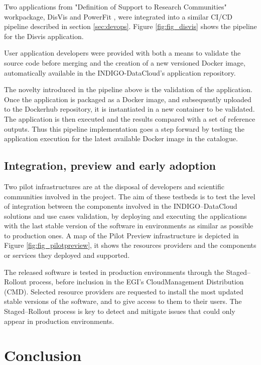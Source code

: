 \documentclass[journal]{IEEEtran}
\begin{document}
Two applications from "Definition of Support to Research Communities" workpackage, 
DisVis \cite{disvis} and PowerFit \cite{powerfit}, were
integrated into a similar CI/CD pipeline described in section \ref{sec:devops}.
Figure \ref{fig:fig_disvis} shows the pipeline for the Disvis application.

User application developers were provided with both a means to validate the
source code before merging and the creation of a new versioned Docker image,
automatically available in the INDIGO-DataCloud’s application repository.

The novelty introduced in the pipeline above is the validation of the application.
Once the application is packaged as a Docker image, and subsequently uploaded
to the Dockerhub repository, it is instantiated in a new container to be validated.
The application is then executed and the results compared with a set of reference outputs.
Thus this pipeline implementation goes a step forward by testing the application
execution for the latest available Docker image in the catalogue.

\subsection{Integration, preview and early adoption}

Two pilot infrastructures are at the disposal of developers and scientific
communities involved in the project. The aim of these testbeds is to test the
level of integration between the components involved in the INDIGO--DataCloud
solutions and use cases validation, by deploying and executing the applications
with the last stable version of the software in environments as similar as 
possible to production ones. A map of the Pilot Preview
infrastructure is depicted in Figure \ref{fig:fig_pilotpreview}, it shows the
resources providers and the components or services they deployed and supported.


The released software is tested in production environments through the
Staged--Rollout process, before inclusion in the EGI's CloudManagement Distribution (CMD). 
Selected resource providers are requested to install
the most updated stable versions of the software, and to give access to them to their users. The
Staged--Rollout process is key to detect and mitigate issues that could only
appear in production environments.

\section{Conclusion}
\label{sec:con}
\end{document}
